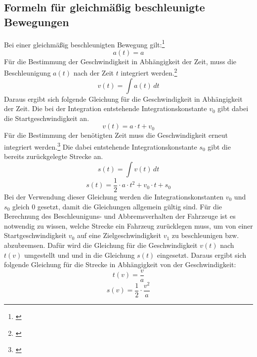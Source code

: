 \subsection{Formeln für gleichmäßig beschleunigte Bewegungen} \label{formulaBeschleunigung}
\noindent Bei einer gleichmäßig beschleunigten Bewegung gilt:\footnote{\citet[S. 22]{richard2011technische}}
\begin{equation}
a(t) = a
\end{equation}
Für die Bestimmung der Geschwindigkeit in Abhängigkeit der Zeit, muss die Beschleunigung $a(t)$ nach der Zeit $t$ integriert werden.\footnote{\citet[S. 20]{richard2011technische}}
\begin{equation}
v(t) = \int a(t) \,dt
\end{equation}
Daraus ergibt sich folgende Gleichung für die Geschwindigkeit in Abhängigkeit der Zeit. Die bei der Integration entstehende Integrationskonstante $v_{0}$ gibt dabei die Startgeschwindigkeit an.
\begin{equation}
v(t) = a \cdot t + v_{0}
\end{equation} %
Für die Bestimmung der benötigten Zeit muss die Geschwindigkeit erneut integriert werden.\footnote{\citet[S. 20]{richard2011technische}} Die dabei entstehende Integrationskonstante $s_{0}$ gibt die bereits zurückgelegte Strecke an.
\begin{equation}
s(t) = \int v(t) \,dt
\end{equation}
\begin{equation}
s(t) =\frac{1}{2} \cdot a \cdot t^{2} + v_{0}  \cdot t + s_{0}
\end{equation}
Bei der Verwendung dieser Gleichung werden die Integrationskonstanten $v_{0}$ und $s_{0}$ gleich $0$ gesetzt, damit die Gleichungen allgemein gültig sind. Für die Berechnung des Beschleuniguns- und Abbremsverhalten der Fahrzeuge ist es notwendig zu wissen, welche Strecke ein Fahrzeug zurücklegen muss, um von einer Startgeschwindigkeit $v_{0}$ auf eine Zielgeschwindigkeit $v_{1}$ zu beschleunigen bzw. abzubremsen. Dafür wird die Gleichung für die Geschwindigkeit $v(t)$ nach $t(v)$ umgestellt und und in die Gleichung $s(t)$ eingesetzt. Daraus ergibt sich folgende Gleichung für die Strecke in Abhängigkeit von der Geschwindigkeit:
\begin{equation}
t(v) = \frac{v}{a}
\end{equation}
\begin{equation}
s(v) =\frac{1}{2} \cdot \frac{v^{2}}{a}
\end{equation}
